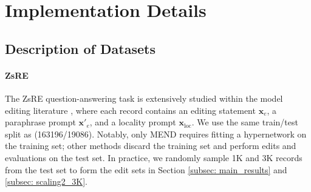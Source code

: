 \documentclass{article}
\begin{document}
\section{Implementation Details}\label{app_sec:implem_details}
\subsection{Description of Datasets}\label{app_subsec:data_description}


\begin{table}[!htbp]
\vspace{-11pt}
    \caption{Bolded text refers to the edit labels $\mathbf{y}_e$. Locality example $\mathbf{x}_{\text{loc}}$ is an unrelated query.}
    \hfill
    \label{tab:dataset-example}
    \vspace{-13pt}
\end{table}


\paragraph{ZsRE}
The ZsRE question-answering task \cite{zsre} is extensively studied within the model editing literature \cite{rome, memit, mend, malmen, t-patcher}, where each record contains an editing statement $\mathbf{x}_e$, a paraphrase prompt $\mathbf{x}'_e$, and a locality prompt $\mathbf{x}_{\text{loc}}$.
We use the same train/test split as \cite{mend} (163196/19086).
Notably, only MEND requires fitting a hypernetwork on the training set; other methods discard the training set and perform edits and evaluations on the test set. 
In practice, we randomly sample 1K and 3K records from the test set to form the edit sets in Section \ref{subsec: main_results} and \ref{subsec: scaling2_3K}.
\end{document}
